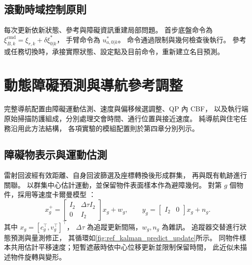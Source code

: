 \subsection{滾動時域控制原則}
\label{subsec:wholebody_receding_horizon}

每次更新依新狀態、參考與障礙資訊重建局部問題。
首步底盤命令為 $\xi_{B,k}^{\mathrm{cmd}}=\xi_{r,k}+\delta\xi_{0|k}^{*}$，
手臂命令為 $u_{a,0|k}^{*}$。
命令通過限制與幾何檢查後執行。
參考或任務切換時，承接實際狀態、設定點及目前命令，重新建立名目預測。

\section{動態障礙預測與導航參考調整}
\label{sec:dynamic_obstacle_avoidance}

完整導航配置由障礙運動估測、速度與偏移候選調整、QP 內 CBF，
以及執行端原始掃描防護組成，分別處理交會時間、通行位置與接近速度。
純導航與住宅任務沿用此方法結構，
各項實驗的模組配置則於第四章分別列示。

\subsection{障礙物表示與運動估測}
\label{subsec:obstacle_representation_prediction}

雷射回波經有效距離、自身回波篩選及座標轉換後形成群集，
再與既有軌跡進行關聯。
以群集中心估計運動，並保留物件表面樣本作為避障幾何。
對第 $g$ 個物件，採用等速度卡爾曼模型
\cite{kalman1960filter}：
\begin{equation}
    x_g^+=
    \begin{bmatrix}I_2&\Delta\tau I_2\\0&I_2\end{bmatrix}x_g+w_g,
    \qquad
    y_g=\begin{bmatrix}I_2&0\end{bmatrix}x_g+n_g .
    \label{eq:ch3_obstacle_tracking_model}
\end{equation}
其中 $x_g=[c_g^\top,v_g^\top]^\top$，
$\Delta\tau$ 為追蹤更新間隔，$w_g,n_g$ 為雜訊。
追蹤器交替進行狀態預測與量測修正\cite{welch2004kalman}，
其循環如\cref{fig:ref_kalman_predict_update}所示。
同物件樣本共用估計平移速度；短暫遮蔽時依中心位移更新並限制保留時間，
此近似未描述物件旋轉與變形。

